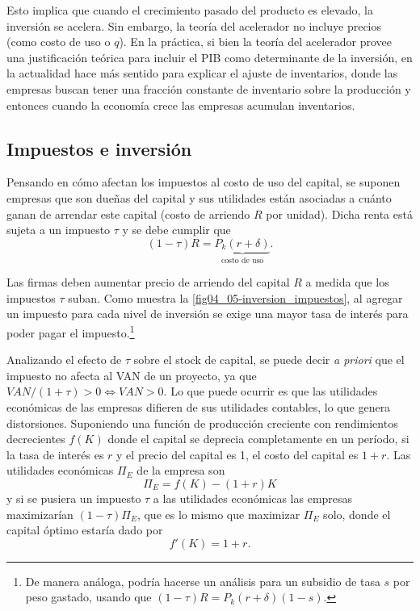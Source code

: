 \documentclass[DeGregorioResumen]{subfiles}
\begin{document}
Esto implica que cuando el crecimiento pasado del producto es elevado, la inversión se acelera. Sin embargo, la teoría del acelerador no incluye precios (como costo de uso o $q$). En la práctica, si bien la teoría del acelerador provee una justificación teórica para incluir el PIB como determinante de la inversión, en la actualidad hace más sentido para explicar el ajuste de inventarios, donde las empresas buscan tener una fracción constante de inventario sobre la producción y entonces cuando la economía crece las empresas acumulan inventarios.

\subsection{Impuestos e inversión}

Pensando en cómo afectan los impuestos al costo de uso del capital, se suponen empresas que son dueñas del capital y sus utilidades están asociadas a cuánto ganan de arrendar este capital (costo de arriendo $R$ por unidad). Dicha renta está sujeta a un impuesto $\tau$ y se debe cumplir que
\begin{equation*}
(1-\tau)R=\underbrace{P_k(r+\delta)}_{\text{costo de uso}}.
\end{equation*}

Las firmas deben aumentar precio de arriendo del capital $R$ a medida que los impuestos $\tau$ suban. Como muestra la \autoref{fig04_05-inversion_impuestos}, al agregar un impuesto para cada nivel de inversión se exige una mayor tasa de interés para poder pagar el impuesto.\footnote{De manera análoga, podría hacerse un análisis para un subsidio de tasa $s$ por peso gastado, usando que $(1-\tau)R= P_k(r+\delta)(1-s)$.}



Analizando el efecto de $\tau$ sobre el stock de capital, se puede decir \textit{a priori} que el impuesto no afecta al VAN de un proyecto, ya que $VAN/(1+\tau)>0 \iff VAN>0 $. Lo que puede ocurrir es que las utilidades económicas de las empresas difieren de sus utilidades contables, lo que genera distorsiones. Suponiendo una función de producción creciente con rendimientos decrecientes $f(K)$ donde el capital se deprecia completamente en un período, si la tasa de interés es $r$ y el precio del capital es 1, el costo del capital es $1+r$. Las utilidades económicas $\Pi_E$ de la empresa son
\begin{equation*}
\Pi_E = f(K) - (1+r)K
\end{equation*}
y si se pusiera un impuesto $\tau$ a las utilidades económicas las empresas maximizarían $(1-\tau)\Pi_E$, que es lo mismo que maximizar $\Pi_E$ solo, donde el capital óptimo estaría dado por
\begin{equation}
f'(K)=1+r.
\end{equation}
\end{document}
